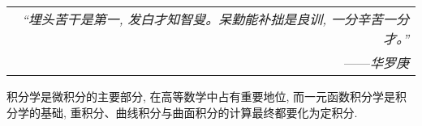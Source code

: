 \begin{flushright}
    \begin{tabular}{r|}
        \textit{“埋头苦干是第一, 发白才知智叟。呆勤能补拙是良训, 一分辛苦一分才。”}\\
        ——\textit{华罗庚}
    \end{tabular}
\end{flushright}

积分学是微积分的主要部分, 在高等数学中占有重要地位, 而一元函数积分学是积分学的基础, 
重积分、曲线积分与曲面积分的计算最终都要化为定积分.
